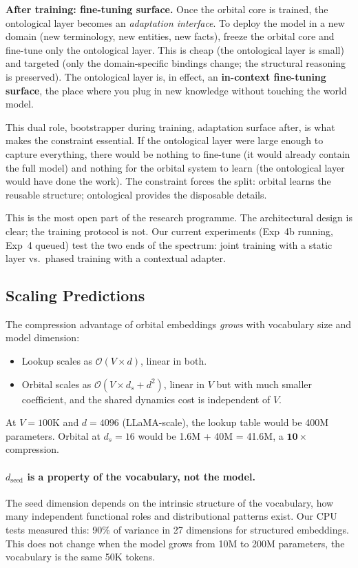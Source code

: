 \documentclass[11pt, a4paper]{article}
\newcommand{\bigO}{\mathcal{O}}
\theoremstyle{remark}
\begin{document}
\textbf{After training: fine-tuning surface.}
Once the orbital core is trained, the ontological layer becomes an \emph{adaptation interface}.
To deploy the model in a new domain (new terminology, new entities, new facts), freeze the orbital core and fine-tune only the ontological layer.
This is cheap (the ontological layer is small) and targeted (only the domain-specific bindings change; the structural reasoning is preserved).
The ontological layer is, in effect, an \textbf{in-context fine-tuning surface}, the place where you plug in new knowledge without touching the world model.

This dual role, bootstrapper during training, adaptation surface after, is what makes the constraint essential.
If the ontological layer were large enough to capture everything, there would be nothing to fine-tune (it would already contain the full model) and nothing for the orbital system to learn (the ontological layer would have done the work).
The constraint forces the split: orbital learns the reusable structure; ontological provides the disposable details.

\bigskip
\noindent
This is the most open part of the research programme.
The architectural design is clear; the training protocol is not.
Our current experiments (Exp~4b running, Exp~4 queued) test the two ends of the spectrum: joint training with a static layer vs.\ phased training with a contextual adapter.

\subsection{Scaling Predictions}

The compression advantage of orbital embeddings \emph{grows} with vocabulary size and model dimension:
\begin{itemize}[nosep]
    \item Lookup scales as $\bigO(V \times d)$, linear in both.
    \item Orbital scales as $\bigO(V \times d_s + d^2)$, linear in $V$ but with much smaller coefficient, and the shared dynamics cost is independent of $V$.
\end{itemize}
At $V = 100$K and $d = 4096$ (LLaMA-scale), the lookup table would be 400M parameters.
Orbital at $d_s = 16$ would be 1.6M + 40M = 41.6M, a $\mathbf{10\times}$ compression.

\paragraph{$d_{\text{seed}}$ is a property of the vocabulary, not the model.}
The seed dimension depends on the intrinsic structure of the vocabulary, how many independent functional roles and distributional patterns exist.
Our CPU tests measured this: 90\% of variance in 27 dimensions for structured embeddings.
This does not change when the model grows from 10M to 200M parameters, the vocabulary is the same 50K tokens.
\end{document}
